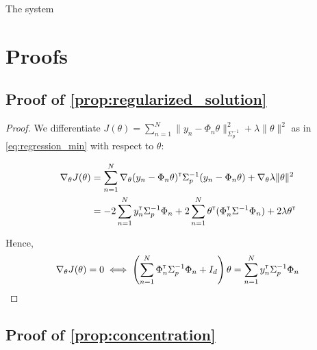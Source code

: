 \documentclass{article}
\begin{document}
The system 





\clearpage
\appendix

\section{Proofs}

\subsection{Proof of \autoref{prop:regularized_solution}}

\begin{proof}
We differentiate $J(\theta) = \sum_{n=1}^N \|y_n -\Phi_n\theta\|_{\Sigma_p^{-1}}^2 + \lambda\|\theta\|_{}^2$ as in  \eqref{eq:regression_min} with respect to $\theta$:

\begin{align*}
    \nabla_{\theta} J(\theta) &= \sum_{n=1}^N\nabla_{\theta} (y_n - \Phi_n\theta)^{\mathsf{\scriptscriptstyle T}}\Sigma_p^{-1}(y_n - \Phi_n\theta) + \nabla_{\theta} \lambda\|\theta\|_{}^2\\
    &= -2\sum_{n=1}^N y_n^{\mathsf{\scriptscriptstyle T}}\Sigma_p^{-1}\Phi_n + 2\sum_{n=1}^N\theta^{\mathsf{\scriptscriptstyle T}}(\Phi_n^{\mathsf{\scriptscriptstyle T}}\Sigma^{-1}\Phi_n) +  2 \lambda \theta^{\mathsf{\scriptscriptstyle T}}
\end{align*}

Hence,
\begin{align*}
    \nabla_{\theta} J(\theta) = 0 \iff \left(\sum_{n=1}^N\Phi_n^{\mathsf{\scriptscriptstyle T}}\Sigma_p^{-1}\Phi_n + I_d\right)\theta = \sum_{n=1}^N y_n^{\mathsf{\scriptscriptstyle T}}\Sigma_p^{-1}\Phi_n
\end{align*}
\end{proof}

\subsection{Proof of \autoref{prop:concentration}}
\end{document}
